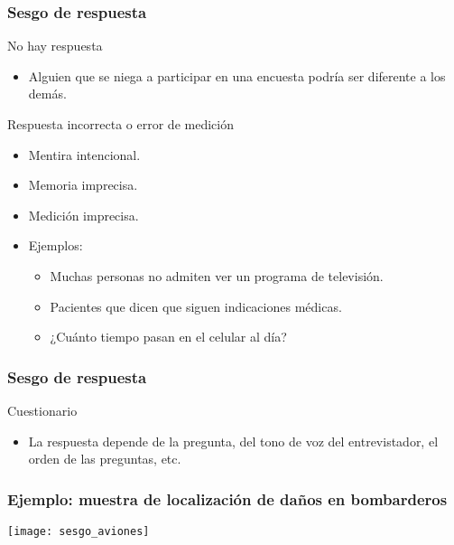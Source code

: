 \documentclass[table]{beamer}
\begin{document}
\begin{frame}
    \frametitle{Sesgo de respuesta}
    \begin{block}{No hay respuesta}
        \begin{itemize}
            \item Alguien que se niega a participar en una encuesta podría ser diferente a los demás.
        \end{itemize}
    \end{block}
    \begin{block}{Respuesta incorrecta o error de medición}
        \begin{itemize}
            \item Mentira intencional.
            \item Memoria imprecisa.
            \item Medición imprecisa.
            \item Ejemplos:
                \begin{itemize}
                    \item Muchas personas no admiten ver un programa de televisión.
                    \item Pacientes que dicen que siguen indicaciones médicas.
                    \item ¿Cuánto tiempo pasan en el celular al día?
                \end{itemize}
        \end{itemize}
    \end{block}
\end{frame}

\begin{frame}
    \frametitle{Sesgo de respuesta}
       \begin{block}{Cuestionario}
        \begin{itemize}
            \item La respuesta depende de la pregunta, del tono de voz del entrevistador, el orden de las preguntas, etc.
        \end{itemize}
    \end{block}
\end{frame}

\begin{frame}
    \frametitle{Ejemplo: muestra de localización de daños en bombarderos}
    \begin{center}
        \texttt{[image: sesgo\_aviones]}
    \end{center}
\end{frame}
\end{document}
